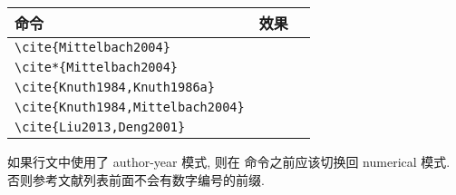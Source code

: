 \begin{center}
  \begin{tabular}{lp{}l}
    \toprule
    命令                                   & 效果\\
    \midrule
    \verb|\cite{Mittelbach2004}|           & \cite{Mittelbach2004}\\
    \verb|\cite*{Mittelbach2004}|          & \cite*{Mittelbach2004}\\
    \verb|\cite{Knuth1984,Knuth1986a}|     & \cite{Knuth1984,Knuth1986a}\\
    \verb|\cite{Knuth1984,Mittelbach2004}| & \cite{Knuth1984,Mittelbach2004}\\
    \verb|\cite{Liu2013,Deng2001}|         & \cite{Liu2013,Deng2001}\\
    \bottomrule
  \end{tabular}
\end{center}

如果行文中使用了 author-year 模式, 则在 \verb|| 命令之前应该切换回 numerical 模式. 否则参考文献列表前面不会有数字编号的前缀.
